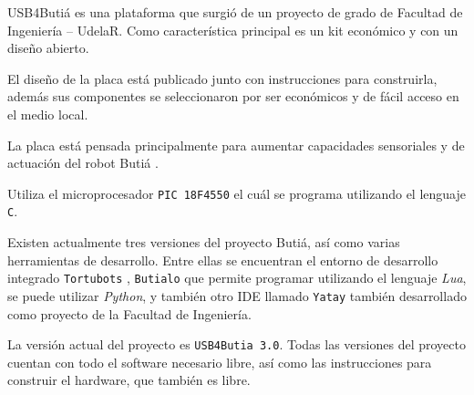 
  USB4Butiá es una plataforma que surgió de un proyecto de grado de Facultad de
Ingeniería – UdelaR.
  Como característica principal es un kit económico y con un diseño abierto.

  El diseño de la placa está publicado junto con instrucciones para construirla,
además sus componentes se seleccionaron por ser económicos
y de fácil acceso en el medio local.

  La placa está pensada principalmente para aumentar capacidades sensoriales
  y de actuación del robot Butiá \cite{butia}.

  Utiliza el microprocesador \texttt{PIC 18F4550} \cite{pic18} el cuál se programa
  utilizando el lenguaje \texttt{C}.

  Existen actualmente tres versiones del proyecto Butiá, así como varias
  herramientas de desarrollo.
  Entre ellas se encuentran el entorno de desarrollo integrado \texttt{Tortubots} \cite{Tortubots},
  \texttt{Butialo} \cite{Butialo} que permite programar utilizando el lenguaje \textit{Lua},
  se puede utilizar \textit{Python}, y también otro IDE llamado \texttt{Yatay} \cite{yatay}
  también desarrollado como proyecto de la Facultad de Ingeniería.

  La versión actual del proyecto es \texttt{USB4Butia 3.0}.
  Todas las versiones del proyecto cuentan con todo el software necesario libre, así
como las instrucciones para construir el hardware, que también es libre.
